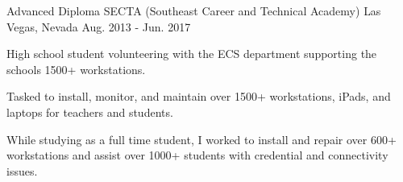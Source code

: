 

\begin{cventries}

  \cventry
    {Advanced Diploma} %
    {SECTA (Southeast Career and Technical Academy)} %
    {Las Vegas, Nevada} %
    {Aug. 2013 - Jun. 2017} %
    {
      \begin{cvitems} %
        \item {High school student volunteering with the ECS department supporting the schools 1500+ workstations.}
        \item{Tasked to install, monitor, and maintain over 1500+ workstations, iPads, and laptops for teachers and students.}
        \item{While studying as a full time student, I worked to install and repair over 600+ workstations and assist over 1000+ students with credential and connectivity issues.}
      \end{cvitems}
    }
    
   

\end{cventries}

